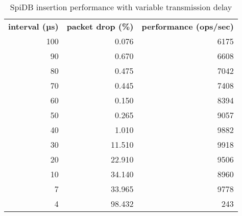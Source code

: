\begin{table}
\begin{tabular}{ r | r | r }
\textbf{interval (µs)} & \textbf{packet drop (\%)} & \textbf{performance (ops/sec)}  \\
100 & 0.076 	& 6175 \\
90	& 0.670		& 6608 \\
80	& 0.475		& 7042 \\
70	& 0.445		& 7408 \\
60	& 0.150		& 8394 \\
50	& 0.265		& 9057 \\
40	& 1.010		& 9882 \\
30	& 11.510	& 9918 \\
20	& 22.910	& 9506 \\ 
10	& 34.140	& 8960 \\
7	& 33.965 	& 9778 \\
4	& 98.432 	& 243 \\
\end{tabular}
\caption{SpiDB insertion performance with variable transmission delay}
\label{table:performance_delay}
\end{table}


